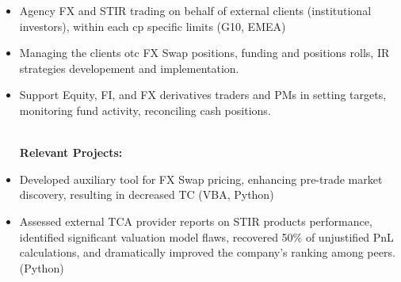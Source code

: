 \documentclass[letterpaper,hidelinks]{article}
\newcommand{\resumeItemRoutine}[1]{
  \item[\small\ding{223}]\small{
    {#1 \vspace{-2pt}}
  }
}
\newcommand{\resumeItemProject}[1]{
  \item[\small\ding{51}]\small{
    {#1 \vspace{-2pt}}
  }
}
\newcommand{\resumeItemListStart}{\begin{itemize}}
\newcommand{\resumeItemListEnd}{\end{itemize}\vspace{-5pt}}
\begin{document}
\vspace{1pt}
\resumeItemListStart
\resumeItemRoutine{Agency FX and STIR trading on behalf of external clients (institutional investors), within each cp specific limits (G10, EMEA)}
\resumeItemRoutine{Managing the clients otc FX Swap positions, funding and positions rolls, IR strategies developement and implementation.}
\resumeItemRoutine{Support Equity, FI, and FX derivatives traders and PMs in setting targets, monitoring fund activity, reconciling cash positions.}
\vspace{2pt}\\
\hspace{-13pt}\textbf{Relevant Projects:}
\vspace{-3pt}
\resumeItemProject{Developed auxiliary tool for FX Swap pricing, enhancing pre-trade market discovery, resulting in decreased TC (VBA, Python)}
\resumeItemProject{Assessed external TCA provider reports on STIR products performance, identified significant valuation model flaws, recovered 50\% of unjustified PnL calculations, and dramatically improved the company's ranking among peers. (Python)}
\resumeItemListEnd
\end{document}
